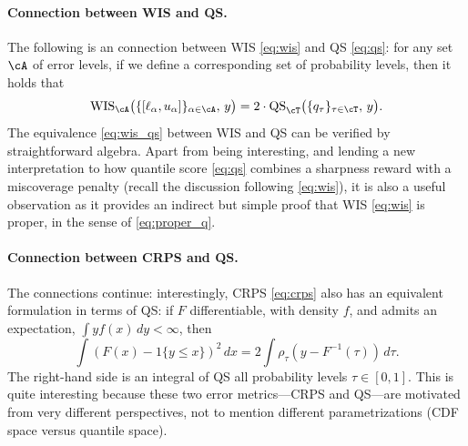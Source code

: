 \documentclass{article}
\begin{document}
\paragraph{Connection between WIS and QS.}

The following is an connection between WIS \eqref{eq:wis} and QS \eqref{eq:qs}: 
for any set $\cA$ of error levels, if we define a corresponding set
 of
probability levels, then it holds that     
\begin{equation}
\label{eq:wis_qs}
\mathrm{WIS}_\cA \big( \{[\ell_\alpha, u_\alpha]\}_{\alpha \in \cA}, \, y \big)  
= 2 \cdot \mathrm{QS}_\cT \big( \{q_\tau\}_{\tau \in \cT}, \, y \big).
\end{equation}
The equivalence \eqref{eq:wis_qs} between WIS and QS can be verified by
straightforward algebra. Apart from being interesting, and lending a new 
interpretation to how quantile score \eqref{eq:qs} combines a sharpness reward
with a miscoverage penalty (recall the discussion following \eqref{eq:wis}), it
is also a useful observation as it provides an indirect but simple proof that
WIS \eqref{eq:wis} is proper, in the sense of \eqref{eq:proper_q}.

\paragraph{Connection between CRPS and QS.}

The connections continue: interestingly, CRPS \eqref{eq:crps} also has an
equivalent formulation in terms of QS: if $F$ differentiable, with density $f$,
and admits an expectation, $\int y f(x) \, dy < \infty$, then    
\begin{equation}
\label{eq:crps_qs}
\int (F(x) - 1\{y \leq x\})^2 \, dx = 
2 \int \rho_\tau(y - F^{-1}(\tau)) \, d\tau. 
\end{equation}
The right-hand side is an integral of QS all probability levels $\tau \in [0,1]$.
This is quite interesting because these two error metrics---CRPS and QS---are 
motivated from very different perspectives, not to mention different
parametrizations (CDF space versus quantile space).   
\end{document}
